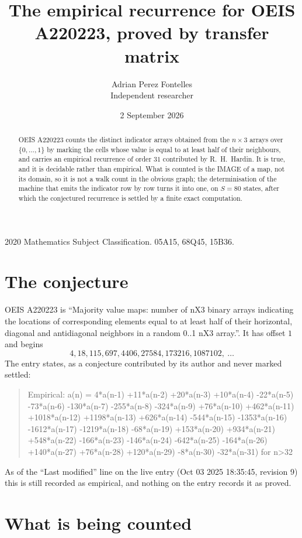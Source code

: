 \documentclass[11pt,a4paper]{article}
\title{The empirical recurrence for OEIS A220223, proved by transfer matrix}
\author{Adrian Perez Fontelles\\ \small Independent researcher}
\date{2 September 2026}
\theoremstyle{plain}
\theoremstyle{definition}
\begin{document}
\maketitle

\begin{abstract}
OEIS A220223 counts the distinct indicator arrays obtained from the $n\times3$ arrays over
$\{0,\dots,1\}$ by marking the cells whose value is equal to at least half of their neighbours, and carries an
empirical recurrence of order $31$ contributed by R.~H.~Hardin. It is true, and it is
decidable rather than empirical. What is counted is the IMAGE of a map, not its domain, so it
is not a walk count in the obvious graph; the determinisation of the machine that emits the
indicator row by row turns it into one, on $S=80$ states, after which the conjectured
recurrence is settled by a finite exact computation.
\end{abstract}

\noindent\small 2020 Mathematics Subject Classification. 05A15, 68Q45, 15B36.\normalsize

\section{The conjecture}

OEIS A220223 is ``Majority value maps: number of nX3 binary arrays indicating the locations of corresponding elements equal to at least half of their horizontal, diagonal and antidiagonal neighbors in a random 0..1 nX3 array.''. It has offset $1$ and begins
\[
4, 18, 115, 697, 4406, 27584, 173216, 1087102,\ \dots
\]
The entry states, as a conjecture contributed by its author and never marked settled:
\begin{quote}
Empirical: a(n) = 4*a(n-1) +11*a(n-2) +20*a(n-3) +10*a(n-4) -22*a(n-5) -73*a(n-6) -130*a(n-7) -255*a(n-8) -324*a(n-9) +76*a(n-10) +462*a(n-11) +1018*a(n-12) +1198*a(n-13) +626*a(n-14) -544*a(n-15) -1353*a(n-16) -1612*a(n-17) -1219*a(n-18) -68*a(n-19) +153*a(n-20) +934*a(n-21) +548*a(n-22) -166*a(n-23) -146*a(n-24) -642*a(n-25) -164*a(n-26) +140*a(n-27) +76*a(n-28) +120*a(n-29) -8*a(n-30) -32*a(n-31) for n>32
\end{quote}
As of the ``Last modified'' line on the live entry (Oct 03 2025 18:35:45, revision 9) this is still
recorded as empirical, and nothing on the entry records it as proved.

\section{What is being counted}
\end{document}
